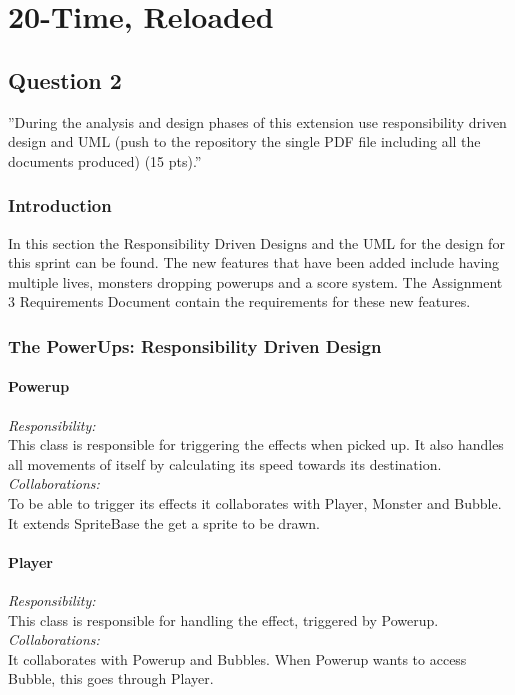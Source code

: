 \chapter{20-Time, Reloaded}

\section{Question 2}

''During the analysis and design phases of this extension use responsibility driven design and UML
(push to the repository the single PDF file including all the documents produced) (15 pts).''


\subsection{Introduction}
In this section the Responsibility Driven Designs and the UML for the design for this sprint can be found. The new features that have been added include having multiple lives, monsters dropping powerups and a score system. The Assignment 3 Requirements Document contain the requirements for these new features.

\subsection{The PowerUps: Responsibility Driven Design}
\subsubsection{Powerup}
\textit{Responsibility:} \\
This class is responsible for triggering the effects when picked up. It also handles all movements of itself by calculating its speed towards its destination. \\
\textit{Collaborations:} \\
To be able to trigger its effects it collaborates with Player, Monster and Bubble. It extends SpriteBase the get a sprite to be drawn.

\subsubsection{Player}
\textit{Responsibility:} \\
This class is responsible for handling the effect, triggered by Powerup. \\
\textit{Collaborations:} \\
It collaborates with Powerup and Bubbles. When Powerup wants to access Bubble, this goes through Player.

